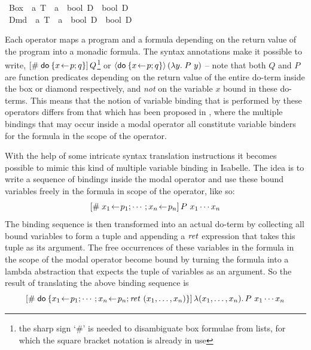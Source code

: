 \begin{isabellebody}
\isanewline
{}\isanewline
\ Box\ {\isacharcolon}{\isacharcolon}\ {\isachardoublequote}{\isacharprime}a\ T\ {\isasymRightarrow}\ {\isacharparenleft}{\isacharprime}a\ {\isasymRightarrow}\ bool\ D{\isacharparenright}\ {\isasymRightarrow}\ bool\ D{\isachardoublequote}\ \ \ \ \ {\isacharparenleft}{\isachardoublequote}{\isacharbrackleft}{\isacharhash}\ {\isacharunderscore}{\isacharbrackright}{\isacharunderscore}{\isachardoublequote}\ {\isacharbrackleft}{}{\isacharcomma}\ {}{}{}{\isacharbrackright}\ {}{}{}{\isacharparenright}\isanewline
\ Dmd\ {\isacharcolon}{\isacharcolon}\ {\isachardoublequote}{\isacharprime}a\ T\
{\isasymRightarrow}\ {\isacharparenleft}{\isacharprime}a\ {\isasymRightarrow}\
bool\ D{\isacharparenright}\ {\isasymRightarrow}\ bool\ D{\isachardoublequote}\
\ \ \ \
{\isacharparenleft}{\isachardoublequote}{\isasymlangle}{\isacharunderscore}{\isasymrangle}{\isacharunderscore}{\isachardoublequote}\
{\isacharbrackleft}{}{\isacharcomma}\
{}{}{}{\isacharbrackright}\
{}{}{}{\isacharparenright}\isamarkupfalse%
\isanewline
\end{isabellebody}

Each operator maps a program and a formula depending on the return value of the
program into a monadic formula. The syntax annotations make it possible to
write, \EG $[\#\;\mathsf{do}\: \{x\!\gets\! p; q\}]\,Q$\footnote{the sharp sign `$\#$' is
  needed to disambiguate box formulae from lists, for which the square bracket
  notation is already in use} or $\PDLDmd{\DoStmt{x\leteq p; q}}(\lambda y\bnd P\ y)$
-- note that both $Q$ and $P$ are function predicates depending on the return
value of the entire do-term inside the box or diamond respectively, and
\emph{not} on the variable $x$ bound in these do-terms. This means that the
notion of variable binding that is performed by these operators differs from
that which has been proposed in \cite{SchroederMossakowski:PDL}, where the
multiple bindings that may occur inside a modal operator all constitute variable
binders for the formula in the scope of the operator.

With the help of some intricate syntax translation instructions it becomes
possible to mimic this kind of multiple variable binding in Isabelle. The idea is
to write a sequence of bindings inside the modal operator and use these bound
variables freely in the formula in scope of the operator, like so:
\[ [\#\;x_1\!\gets\! p_1; \cdots; x_n\!\gets\! p_n]\,{P\ x_1\cdots x_n} \] The binding
sequence is then transformed into an actual do-term by collecting all bound
variables to form a tuple and appending a $\mathit{ret}$
expression that takes this tuple as its argument.  The free occurrences of these
variables in the formula in the scope of the modal operator become bound by
turning the formula into a lambda abstraction that expects the tuple of
variables as an argument. So the result of translating the above binding
sequence is
\[ [\#\;\mathsf{do}\: \{x_1\!\gets\! p_1; \cdots; x_n\!\gets\! p_n;
    \mathit{ret}~(x_1,\ldots,x_n)\}]\,{{\lambda (x_1,\ldots,x_n).\,P\ x_1\cdots x_n}} \]

